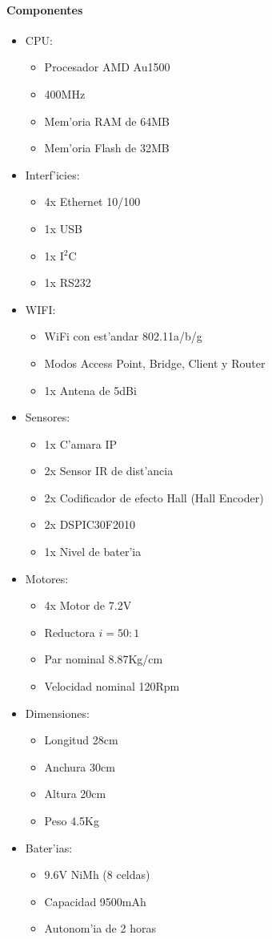 \documentclass[twoside]{article}
\begin{document}
\paragraph{Componentes}
\begin{itemize}
\item CPU:
	\begin{itemize}
	\item Procesador AMD Au1500
	\item 400MHz
	\item Mem'oria RAM de 64MB
	\item Mem'oria Flash de 32MB
	\end{itemize}
\item Interf'icies:
	\begin{itemize}
	\item 4x Ethernet 10/100
	\item 1x USB
	\item 1x I$^{2}$C
	\item 1x RS232
	\end{itemize}
\item WIFI:
	\begin{itemize}
	\item WiFi con est'andar 802.11a/b/g
	\item Modos Access Point, Bridge, Client y Router
	\item 1x Antena de 5dBi
	\end{itemize}
\item Sensores:
	\begin{itemize}
	\item 1x C'amara IP
	\item 2x Sensor IR de dist'ancia
	\item 2x Codificador de efecto Hall (Hall Encoder) 
	\item 2x DSPIC30F2010
	\item 1x Nivel de bater'ia
	\end{itemize}
\item Motores:
	\begin{itemize}
	\item 4x Motor de 7.2V
	\item Reductora $i=50:1$
	\item Par nominal 8.87Kg/cm
	\item Velocidad nominal 120Rpm
	\end{itemize}
\item Dimensiones:
	\begin{itemize}
	\item Longitud 28cm
	\item Anchura 30cm
	\item Altura 20cm
	\item Peso 4.5Kg
	\end{itemize}
\item Bater'ias:
	\begin{itemize}
	\item 9.6V NiMh (8 celdas)
	\item Capacidad 9500mAh
	\item Autonom'ia de 2 horas
	\end{itemize}
\end{itemize}
\end{document}
